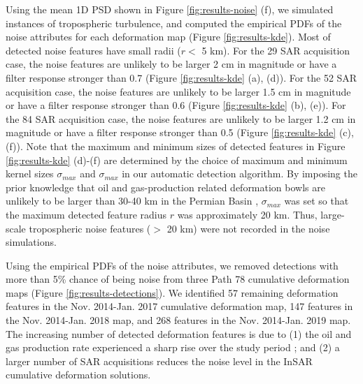 Using the mean 1D PSD shown in Figure \ref{fig:results-noise} (f), we simulated instances of tropospheric turbulence, and computed the empirical PDFs of the noise attributes for each deformation map (Figure \ref{fig:results-kde}).  Most of detected noise features have small radii ($r <$ 5 km). For the 29 SAR acquisition case, the noise features are unlikely to be larger 2 cm in magnitude or have a filter response stronger than 0.7 (Figure \ref{fig:results-kde} (a), (d)). For the 52 SAR acquisition case, the noise features are unlikely to be larger 1.5 cm in magnitude or have a filter response stronger than 0.6 (Figure \ref{fig:results-kde} (b), (e)). For the 84 SAR acquisition case, the noise features are unlikely to be larger 1.2 cm in magnitude or have a filter response stronger than 0.5 (Figure \ref{fig:results-kde} (c), (f)).
Note that the maximum and minimum sizes of detected features in Figure \ref{fig:results-kde} (d)-(f) are determined by the choice of maximum and minimum kernel sizes $\sigma_{max}$ and $\sigma_{max}$ in our automatic detection algorithm. By imposing the prior knowledge that oil and gas-production related deformation bowls are unlikely to be larger than 30-40 km in the Permian Basin \citep{Staniewicz2020InsarRevealsComplex}, $\sigma_{max}$ was set so that the maximum detected feature radius $r$ was approximately 20 km. Thus, large-scale tropospheric noise features ($>$ 20 km) were not recorded in the noise simulations.




Using the empirical PDFs of the noise attributes, we removed detections with more than 5\% chance of being noise from three Path 78 cumulative deformation maps (Figure \ref{fig:results-detections}). We identified 57 remaining deformation features in the Nov. 2014-Jan. 2017 cumulative deformation map, 147 features in the Nov. 2014-Jan. 2018 map, and 268 features in the Nov. 2014-Jan. 2019 map. The increasing number of detected deformation features is due to (1) the oil and gas production rate experienced a sharp rise over the study period \citep{Staniewicz2020InsarRevealsComplex}; and (2) a larger number of SAR acquisitions reduces the noise level in the InSAR cumulative deformation solutions.

